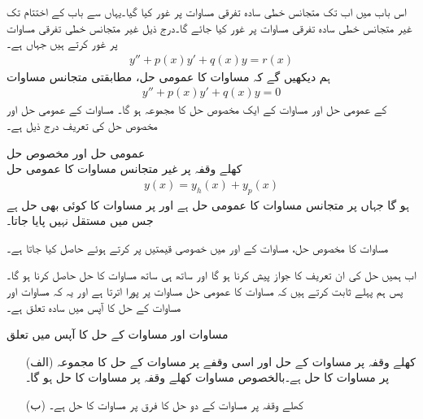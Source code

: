 اس باب میں اب تک متجانس خطی سادہ تفرقی مساوات پر غور کیا گیا۔یہاں سے باب کے اختتام تک غیر متجانس خطی سادہ تفرقی مساوات پر غور کیا جائے گا۔درج ذیل غیر متجانس خطی تفرقی مساوات پر غور کرتے ہیں جہاں  ہے۔
\begin{align}\label{مساوات_سادہ_دو_غیر_متجانس_الف}
y''+p(x)y'+q(x)y=r(x)
\end{align}
ہم دیکھیں گے کہ مساوات  کا عمومی حل، مطابقتی متجانس مساوات 
\begin{align}\label{مساوات_سادہ_دو_غیر_متجانس_ب}
y''+p(x)y'+q(x)y=0
\end{align}
کے عمومی حل اور مساوات  کے ایک مخصوص حل کا مجموعہ ہو گا۔ مساوات  کے عمومی حل اور مخصوص حل کی تعریف درج ذیل ہے۔

\quad عمومی حل اور مخصوص حل\\
کھلے وقفہ  پر غیر متجانس  مساوات  کا عمومی حل
\begin{align}\label{مساوات_سادہ_دو_غیر_متجانس_پ}
y(x)=y_h(x)+y_p(x)
\end{align}
ہو گا جہاں  پر  متجانس مساوات  کا عمومی حل ہے اور  پر  مساوات  کا کوئی بھی حل ہے جس میں مستقل نہیں پایا جاتا۔

مساوات  کا مخصوص حل، مساوات  کے   اور  میں خصوصی قیمتیں پر کرتے ہوئے حاصل کیا جاتا ہے۔

اب ہمیں حل کی ان تعریف کا جواز پیش کرنا ہو گا اور ساتھ ہی ساتھ مساوات  کا  حل  حاصل کرنا ہو گا۔پس ہم پہلے ثابت کرتے ہیں کہ مساوات  کا عمومی حل مساوات  پر پورا اترتا ہے اور یہ کہ مساوات  اور مساوات  کے حل کا آپس میں سادہ تعلق ہے۔

\quad مساوات  اور مساوات  کے حل کا آپس میں تعلق\\
\begin{enumerate}
\item[(الف)]
کھلے وقفہ  پر مساوات  کے حل  اور اسی وقفے پر مساوات  کے حل  کا مجموعہ  پر مساوات  کا حل ہے۔بالخصوص مساوات  کھلے وقفہ  پر مساوات  کا حل ہو گا۔
\item[(ب)]
کھلے وقفہ  پر مساوات  کے دو حل کا فرق  پر مساوات  کا حل ہے۔ 
\end{enumerate}

